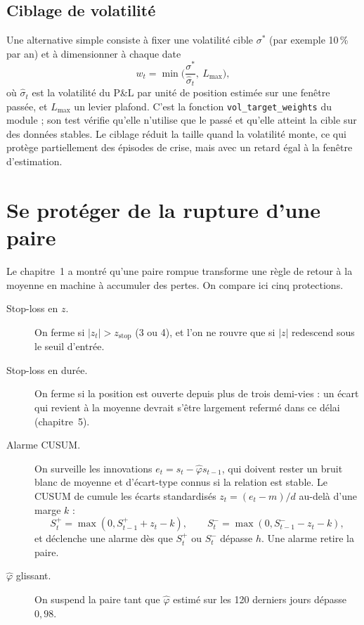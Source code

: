 \subsection{Ciblage de volatilité}

Une alternative simple consiste à fixer une volatilité cible $\sigma^\ast$ (par exemple 10\,\% par an) et à dimensionner à chaque date
\[
w_t = \min\!\Big(\frac{\sigma^\ast}{\hat\sigma_t},\ L_{\max}\Big),
\]
où $\hat\sigma_t$ est la volatilité du P\&L par unité de position estimée sur une fenêtre passée, et $L_{\max}$ un levier plafond. C'est la fonction \texttt{vol\_target\_weights} du module ; son test vérifie qu'elle n'utilise que le passé et qu'elle atteint la cible sur des données stables. Le ciblage réduit la taille quand la volatilité monte, ce qui protège partiellement des épisodes de crise, mais avec un retard égal à la fenêtre d'estimation.

\section{Se protéger de la rupture d'une paire}

Le chapitre~1 a montré qu'une paire rompue transforme une règle de retour à la moyenne en machine à accumuler des pertes. On compare ici cinq protections.

\begin{description}
\item[Stop-loss en $z$.] On ferme si $|z_t| > z_{\text{stop}}$ (3 ou 4), et l'on ne rouvre que si $|z|$ redescend sous le seuil d'entrée.
\item[Stop-loss en durée.] On ferme si la position est ouverte depuis plus de trois demi-vies : un écart qui revient à la moyenne devrait s'être largement refermé dans ce délai (chapitre~5).
\item[Alarme CUSUM.] On surveille les innovations $e_t = s_t - \hat\varphi s_{t-1}$, qui doivent rester un bruit blanc de moyenne et d'écart-type connus si la relation est stable. Le CUSUM de \citet{page1954} cumule les écarts standardisés $z_t = (e_t - m)/d$ au-delà d'une marge $k$ :
\[
S^+_t = \max(0, S^+_{t-1} + z_t - k), \qquad S^-_t = \max(0, S^-_{t-1} - z_t - k),
\]
et déclenche une alarme dès que $S^+_t$ ou $S^-_t$ dépasse $h$. Une alarme retire la paire.
\item[$\hat\varphi$ glissant.] On suspend la paire tant que $\hat\varphi$ estimé sur les 120 derniers jours dépasse $0{,}98$.
\end{description}

